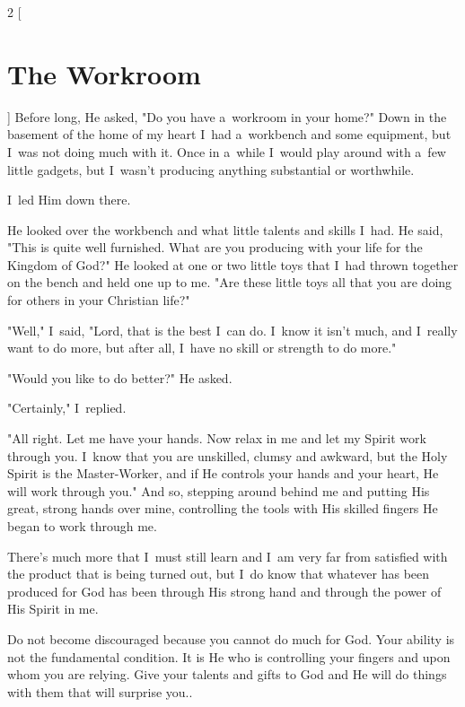 \documentclass[a4paper,12pt]{article}
\begin{document}
\begin{multicols}{2}
    [
\section*{The Workroom}
    ]
Before long, He asked, "Do you have a~workroom in your home?" Down in the basement of the home of my heart I~had a~workbench and some equipment, but I~was not doing much with it. Once in a~while I~would play around with a~few little gadgets, but I~wasn't producing anything substantial or worthwhile. 

I~led Him down there. 

He looked over the workbench and what little talents and skills I~had. He said, "This is quite well furnished. What are you producing with your life for the Kingdom of God?" He looked at one or two little toys that I~had thrown together on the bench and held one up to me. "Are these little toys 
all that you are doing for others in your Christian life?" 

"Well," I~said, "Lord, that is the best I~can do. I~know it isn't much, and I~really want to do more, but after all, I~have no skill or strength to do more." 

"Would you like to do better?" He asked. 

"Certainly," I~replied. 

"All right. Let me have your hands. Now relax in me and let my Spirit work through you. I~know that you are unskilled, clumsy and awkward, but the Holy Spirit is the Master-Worker, and if He controls your hands and your heart, He will work through you." And so, stepping around behind me and putting His great, strong hands over mine, controlling the tools with His skilled fingers He began to work through me. 

There's much more that I~must still learn and I~am very far from satisfied with the product that is being turned out, but I~do know that whatever has been produced for God has been through His strong hand and through the power of His Spirit in me. 

Do not become discouraged because you cannot do much for God. Your ability is not the fundamental condition. It is He who is controlling your fingers and upon whom you are relying. Give your talents and gifts to God and He will do things with them that will surprise you.. 
\end{multicols}
\end{document}
